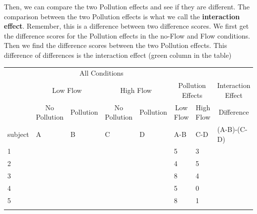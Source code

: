 \documentclass[
  letterpaper,
  DIV=11,
  numbers=noendperiod]{scrreprt}
\begin{document}
Then, we can compare the two Pollution effects and see if they are
different. The comparison between the two Pollution effects is what we
call the \textbf{interaction effect}. Remember, this is a difference
between two difference scores. We first get the difference scores for
the Pollution effects in the no-Flow and Flow conditions. Then we find
the difference scores between the two Pollution effects. This difference
of differences is the interaction effect (green column in the table)

\begin{table}
\centering
\begin{tabular}{l|>{}l|>{}l|>{}l|>{}l|l|l|>{}l}
\hline
\multicolumn{1}{c|}{ } & \multicolumn{4}{c|}{ All Conditions} & \multicolumn{3}{c}{ } \\
\cline{2-5}
\multicolumn{1}{c|}{ } & \multicolumn{2}{c|}{Low Flow} & \multicolumn{2}{c|}{High Flow} & \multicolumn{2}{c|}{ Pollution Effects } & \multicolumn{1}{c}{Interaction Effect } \\
\cline{2-3} \cline{4-5} \cline{6-7} \cline{8-8}
\multicolumn{1}{c|}{ } & \multicolumn{1}{c|}{No Pollution} & \multicolumn{1}{c|}{Pollution} & \multicolumn{1}{c|}{No Pollution} & \multicolumn{1}{c|}{Pollution} & \multicolumn{1}{c|}{Low Flow} & \multicolumn{1}{c|}{High Flow} & \multicolumn{1}{c}{Difference} \\
\cline{2-2} \cline{3-3} \cline{4-4} \cline{5-5} \cline{6-6} \cline{7-7} \cline{8-8}
subject & A & B & C & D & A-B & C-D & (A-B)-(C-D)\\
\hline
1 & \cellcolor{yellow}{10} & \cellcolor{lightgray}{5} & \cellcolor{yellow}{12} & \cellcolor{lightgray}{9} & 5 & 3 & \cellcolor{lightgray}{2}\\
\hline
2 & \cellcolor{yellow}{8} & \cellcolor{lightgray}{4} & \cellcolor{yellow}{13} & \cellcolor{lightgray}{8} & 4 & 5 & \cellcolor{lightgray}{-1}\\
\hline
3 & \cellcolor{yellow}{11} & \cellcolor{lightgray}{3} & \cellcolor{yellow}{14} & \cellcolor{lightgray}{10} & 8 & 4 & \cellcolor{lightgray}{4}\\
\hline
4 & \cellcolor{yellow}{9} & \cellcolor{lightgray}{4} & \cellcolor{yellow}{11} & \cellcolor{lightgray}{11} & 5 & 0 & \cellcolor{lightgray}{5}\\
\hline
5 & \cellcolor{yellow}{10} & \cellcolor{lightgray}{2} & \cellcolor{yellow}{13} & \cellcolor{lightgray}{12} & 8 & 1 & \cellcolor{lightgray}{7}\\
\hline
\cellcolor{lightgray}{Means} & \cellcolor{lightgray}{} & \cellcolor{lightgray}{} & \cellcolor{lightgray}{} & \cellcolor{lightgray}{} & \cellcolor{lightgray}{6} & \cellcolor{lightgray}{2.6} & \cellcolor{lightgray}{3.4}\\
\hline
\end{tabular}
\end{table}
\end{document}

